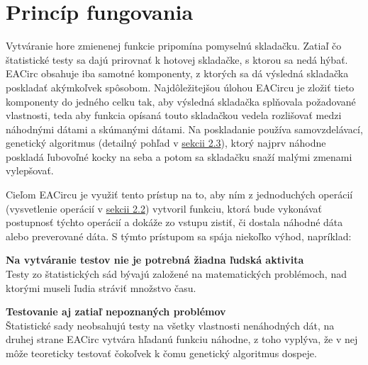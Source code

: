 \section{Princíp fungovania}
\label{sec:principle}

Vytváranie hore zmienenej funkcie pripomína pomyselnú skladačku. Zatiaľ čo štatistické testy sa dajú prirovnať k hotovej skladačke, s ktorou sa nedá hýbať. EACirc obsahuje iba samotné komponenty, z ktorých sa dá výsledná skladačka poskladať akýmkoľvek spôsobom. Najdôležitejšou úlohou EACircu je zložiť tieto komponenty do jedného celku tak, aby výsledná skladačka splňovala požadované vlastnosti, teda aby funkcia opísaná touto skladačkou vedela rozlišovať medzi náhodnými dátami a skúmanými dátami. Na poskladanie používa samovzdelávací, genetický algoritmus (detailný pohľad v \hyperref[sec:genetics]{sekcii 2.3}), ktorý najprv náhodne poskladá ľubovoľné kocky na seba a potom sa skladačku snaží malými zmenami vylepšovať.

Cieľom EACircu je využiť tento prístup na to, aby ním z jednoduchých operácií (vysvetlenie operácií v \hyperref[sec:nodes]{sekcii 2.2}) vytvoril funkciu, ktorá bude vykonávať postupnosť týchto operácií a dokáže zo vstupu zistiť, či dostala náhodné dáta alebo preverované dáta. S týmto prístupom sa spája niekoľko výhod, napríklad:
\begin{myItemize}
	\item \textbf{Na vytváranie testov nie je potrebná žiadna ľudská aktivita}\\Testy zo štatistických sád bývajú založené na matematických problémoch, nad ktorými museli ľudia stráviť množstvo času.
	\item \textbf{Testovanie aj zatiaľ nepoznaných problémov}\\Štatistické sady neobsahujú testy na všetky vlastnosti nenáhodných dát, na druhej strane EACirc vytvára hľadanú funkciu náhodne, z toho vyplýva, že v nej môže teoreticky testovať čokoľvek k čomu genetický algoritmus dospeje.
\end{myItemize}


